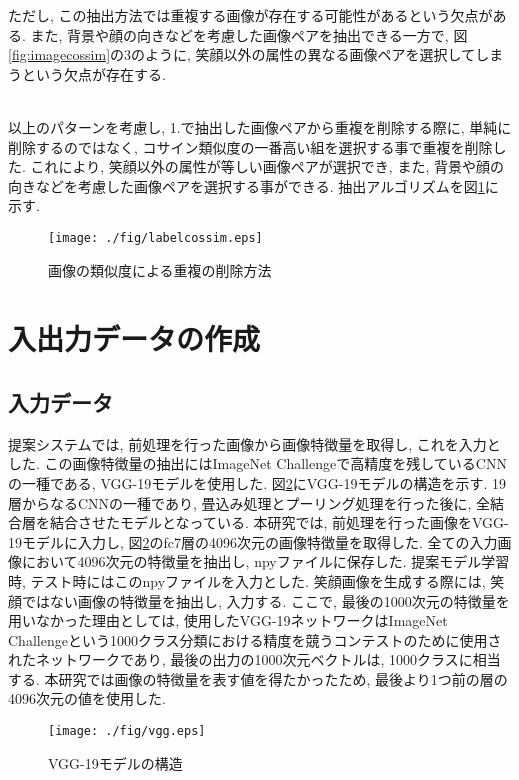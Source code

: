 \begin{description}
ただし, この抽出方法では重複する画像が存在する可能性があるという欠点がある. また, 背景や顔の向きなどを考慮した画像ペアを抽出できる一方で, 図\ref{fig:imagecossim}の3のように, 笑顔以外の属性の異なる画像ペアを選択してしまうという欠点が存在する. 

\item[4. 1.で抽出した画像ペアから画像の類似度を利用して重複を削除する方法]\mbox{}\\ 
以上のパターンを考慮し, 1.で抽出した画像ペアから重複を削除する際に, 単純に削除するのではなく, コサイン類似度の一番高い組を選択する事で重複を削除した. これにより, 笑顔以外の属性が等しい画像ペアが選択でき, また, 背景や顔の向きなどを考慮した画像ペアを選択する事ができる. 抽出アルゴリズムを図\ref{fig:labelcossim}に示す. 
\begin{figure}[H]
 	\begin{center}
 		\texttt{[image: ./fig/labelcossim.eps]}
 		\caption{画像の類似度による重複の削除方法}
 		\label{fig:labelcossim}
 	\end{center}
\end{figure}
\end{description}

\section{入出力データの作成}

\subsection{入力データ}
提案システムでは, 前処理を行った画像から画像特徴量を取得し, これを入力とした. この画像特徴量の抽出にはImageNet Challengeで高精度を残しているCNNの一種である, VGG-19モデルを使用した\cite{vgg}. 図\ref{fig:vgg}にVGG-19モデルの構造を示す. 19層からなるCNNの一種であり, 畳込み処理とプーリング処理を行った後に, 全結合層を結合させたモデルとなっている. 本研究では, 前処理を行った画像をVGG-19モデルに入力し, 図\ref{fig:vgg}のfc7層の4096次元の画像特徴量を取得した. 全ての入力画像において4096次元の特徴量を抽出し, npyファイルに保存した. 提案モデル学習時, テスト時にはこのnpyファイルを入力とした. 笑顔画像を生成する際には, 笑顔ではない画像の特徴量を抽出し, 入力する. ここで, 最後の1000次元の特徴量を用いなかった理由としては, 使用したVGG-19ネットワークはImageNet Challengeという1000クラス分類における精度を競うコンテストのために使用されたネットワークであり, 最後の出力の1000次元ベクトルは, 1000クラスに相当する. 本研究では画像の特徴量を表す値を得たかったため, 最後より1つ前の層の4096次元の値を使用した.  
\begin{figure}[H]
 	\begin{center}
 		\texttt{[image: ./fig/vgg.eps]}
 		\caption{VGG-19モデルの構造}
 		\label{fig:vgg}
 	\end{center}
\end{figure}


